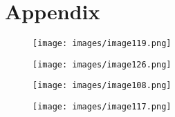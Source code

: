 \documentclass{usiinftr}
\begin{document}
\clearpage



\clearpage
\section{Appendix}

\begin{figure}[h!] 
\centering
\texttt{[image: images/image119.png]}
\end{figure}

\begin{figure}[h!] 
\centering
\texttt{[image: images/image126.png]}
\end{figure}

\begin{figure}[h!] 
\centering
\texttt{[image: images/image108.png]}
\end{figure}


\begin{figure}[h!] 
\centering
\texttt{[image: images/image117.png]}
\end{figure}
\end{document}

